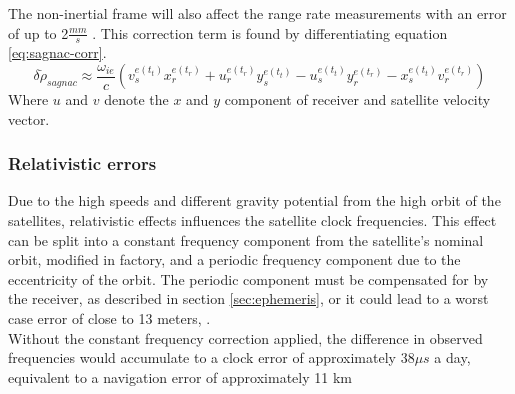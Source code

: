 The non-inertial frame will also affect the range rate measurements with an error of up to 2$\frac{mm}{s}$ \cite{groves2013principles}. This correction term is found by differentiating equation \ref{eq:sagnac-corr}.
\begin{equation}
    \delta\dot{\rho}_{sagnac} \approx \frac{\omega_{ie}}{c}(v^{e(t_t)}_{s}x^{e(t_r)}_{r} + u^{e(t_r)}_{r}y^{e(t_t)}_{s}-u^{e(t_t)}_{s}y^{e(t_r)}_{r}-x^{e(t_t)}_{s}v^{e(t_r)}_{r})
\end{equation}
Where $u$ and $v$ denote the $x$ and $y$ component of receiver and satellite velocity vector.

\subsubsection{Relativistic errors}
Due to the high speeds and different gravity potential from the high orbit of the satellites, relativistic effects influences the satellite clock frequencies. This effect can be split into a constant frequency component from the satellite's nominal orbit, modified in factory, and a periodic frequency component due to the eccentricity of the orbit. The periodic component must be compensated for by the receiver, as described in section \ref{sec:ephemeris}, or it could lead to a worst case error of close to 13 meters, \cite{misra2006global}.\\

Without the constant frequency correction applied, the difference in observed frequencies would accumulate to a clock error of approximately $38 \mu s$ a day, equivalent to a navigation error of approximately 11 km \cite{pascual2007introducing}
